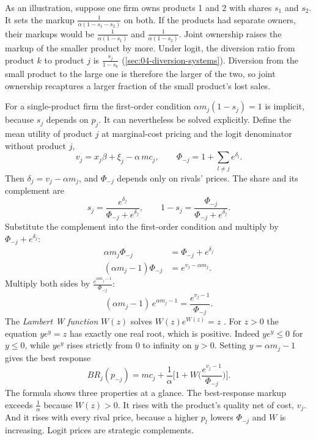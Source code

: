 As an illustration, suppose one firm owns products 1 and 2 with shares $s_1$ and $s_2$. It sets the markup
$\frac{1}{\alpha(1 - s_1 - s_2)}$ on both. If the products had separate owners, their markups would be
$\frac{1}{\alpha(1 - s_1)}$ and $\frac{1}{\alpha(1 - s_2)}$. Joint ownership raises the markup of the smaller
product by more. Under logit, the diversion ratio from product $k$ to product $j$ is $\frac{s_j}{1 - s_k}$
(\cref{sec:04-diversion-systems}). Diversion from the small product to the large one is therefore the larger of the
two, so joint ownership recaptures a larger fraction of the small product's lost sales.

For a single-product firm the first-order condition $\alpha m_j(1 - s_j) = 1$ is implicit, because $s_j$ depends
on $p_j$. It can nevertheless be solved explicitly. Define the mean utility of product $j$ at marginal-cost
pricing and the logit denominator without product $j$,
\begin{equation*}
v_j = x_j\beta + \xi_j - \alpha\,mc_j,
\qquad
\Phi_{-j} = 1 + \sum_{l \ne j}e^{\delta_l}.
\end{equation*}
Then $\delta_j = v_j - \alpha m_j$, and $\Phi_{-j}$ depends only on rivals' prices. The share and its complement
are
\begin{equation*}
s_j = \frac{e^{\delta_j}}{\Phi_{-j} + e^{\delta_j}},
\qquad
1 - s_j = \frac{\Phi_{-j}}{\Phi_{-j} + e^{\delta_j}}.
\end{equation*}
Substitute the complement into the first-order condition and multiply by $\Phi_{-j} + e^{\delta_j}$:
\begin{align*}
\alpha m_j\Phi_{-j} &= \Phi_{-j} + e^{\delta_j} \\
(\alpha m_j - 1)\Phi_{-j} &= e^{v_j - \alpha m_j}.
\end{align*}
Multiply both sides by $\frac{e^{\alpha m_j - 1}}{\Phi_{-j}}$:
\begin{equation*}
(\alpha m_j - 1)\,e^{\alpha m_j - 1} = \frac{e^{v_j - 1}}{\Phi_{-j}}.
\end{equation*}
The \emph{Lambert W function} $W(z)$ solves $W(z)e^{W(z)} = z$ \citep{CorlessEtAl1996}. For $z > 0$ the equation
$ye^y = z$ has exactly one real root, which is positive. Indeed $ye^y \le 0$ for $y \le 0$, while $ye^y$ rises
strictly from 0 to infinity on $y > 0$. Setting $y = \alpha m_j - 1$ gives the best response
\begin{equation}\label{eq:04-logit-br}
BR_j(p_{-j}) = mc_j + \frac{1}{\alpha}\Big[1 + W\Big(\frac{e^{v_j - 1}}{\Phi_{-j}}\Big)\Big].
\end{equation}
The formula shows three properties at a glance. The best-response markup exceeds $\frac{1}{\alpha}$ because
$W(z) > 0$. It rises with the product's quality net of cost, $v_j$. And it rises with every rival price, because
a higher $p_l$ lowers $\Phi_{-j}$ and $W$ is increasing. Logit prices are strategic complements.

